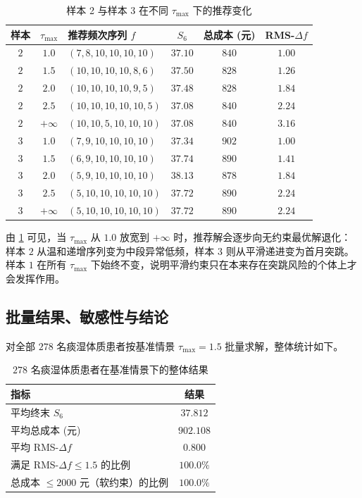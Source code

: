 \documentclass{MathorCupmodeling}
\begin{document}
\begin{table}[H]
\centering\small
\caption{样本 2 与样本 3 在不同 $\tau_{\max}$ 下的推荐变化}\label{tab:q3-tau-sens}
\begin{tabular}{@{}c c l c c c@{}}
\toprule
样本 & $\tau_{\max}$ & 推荐频次序列 $f$ & $S_6$ & 总成本 (元) & RMS-$\Delta f$ \\
\midrule
$2$ & $1.0$ & $(7,8,10,10,10,10)$ & $37.10$ & $840$ & $1.00$ \\
$2$ & $1.5$ & $(10,10,10,10,8,6)$ & $37.50$ & $828$ & $1.26$ \\
$2$ & $2.0$ & $(10,10,10,10,9,5)$ & $37.48$ & $828$ & $1.84$ \\
$2$ & $2.5$ & $(10,10,10,10,10,5)$ & $37.08$ & $840$ & $2.24$ \\
$2$ & $+\infty$ & $(10,10,5,10,10,10)$ & $37.08$ & $840$ & $3.16$ \\
$3$ & $1.0$ & $(7,9,10,10,10,10)$ & $37.34$ & $902$ & $1.00$ \\
$3$ & $1.5$ & $(6,9,10,10,10,10)$ & $37.74$ & $890$ & $1.41$ \\
$3$ & $2.0$ & $(5,9,10,10,10,10)$ & $38.13$ & $878$ & $1.84$ \\
$3$ & $2.5$ & $(5,10,10,10,10,10)$ & $37.72$ & $890$ & $2.24$ \\
$3$ & $+\infty$ & $(5,10,10,10,10,10)$ & $37.72$ & $890$ & $2.24$ \\
\bottomrule
\end{tabular}
\end{table}

由 \cref{tab:q3-tau-sens} 可见，当 $\tau_{\max}$ 从 $1.0$ 放宽到 $+\infty$ 时，推荐解会逐步向无约束最优解退化：样本 $2$ 从温和递增序列变为中段异常低频，样本 $3$ 则从平滑递进变为首月突跳。样本 $1$ 在所有 $\tau_{\max}$ 下始终不变，说明平滑约束只在本来存在突跳风险的个体上才会发挥作用。

\subsection{批量结果、敏感性与结论}

对全部 $278$ 名痰湿体质患者按基准情景 $\tau_{\max}=1.5$ 批量求解，整体统计如下。

\begin{table}[H]
\centering\small
\caption{$278$ 名痰湿体质患者在基准情景下的整体结果}\label{tab:q3-batch-overall}
\begin{tabular}{@{}l c@{}}
\toprule
指标 & 结果 \\
\midrule
平均终末 $S_6$ & $37.812$ \\
平均总成本 (元) & $902.108$ \\
平均 RMS-$\Delta f$ & $0.800$ \\
满足 RMS-$\Delta f \le 1.5$ 的比例 & $100.0\%$ \\
总成本 $\le 2000$ 元（软约束）的比例 & $100.0\%$ \\
\bottomrule
\end{tabular}
\end{table}
\end{document}
